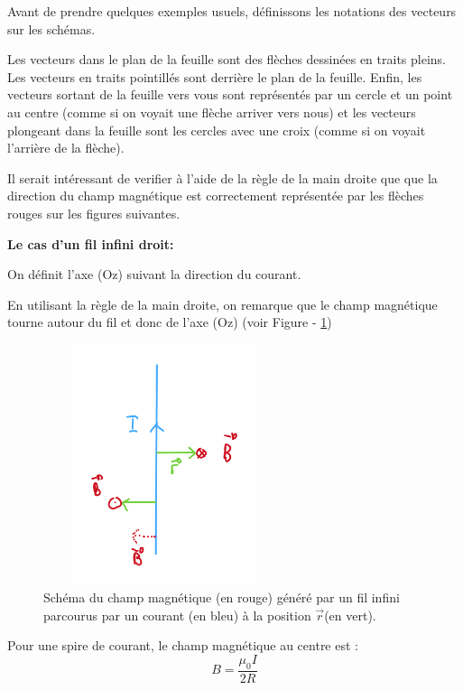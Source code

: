 \documentclass[14pt]{article}
\begin{document}
Avant de prendre quelques exemples usuels, définissons les notations des vecteurs sur les schémas.

Les vecteurs dans le plan de la feuille sont des flèches dessinées en traits pleins. Les vecteurs en traits pointillés sont derrière le plan de la feuille. Enfin, les vecteurs sortant de la feuille vers vous sont représentés par un cercle et un point au centre (comme si on voyait une flèche arriver vers nous) et les vecteurs plongeant dans la feuille sont les cercles avec une croix (comme si on voyait l'arrière de la flèche).

Il serait intéressant de verifier à l'aide de la règle de la main droite que que la direction du champ magnétique est correctement représentée par les flèches rouges sur les figures suivantes.

\textbf{Le cas d'un fil infini droit:}


On définit l'axe (Oz) suivant la direction du courant.

En utilisant la règle de la main droite, on remarque que le champ magnétique tourne autour du fil et donc de l'axe (Oz) (voir Figure - \ref{fig:fil})
 
\hspace{0.5pt}

\begin{figure}
    \centering
    \includegraphics[width=200pt, height=200pt]{fil.png}
    \caption{Schéma du champ magnétique (en rouge) généré par un fil infini parcourus par un courant (en bleu) à la position $\vec{r}$(en vert).}
    \label{fig:fil}
\end{figure}


Pour une spire de courant, le champ magnétique au centre est :
\begin{equation} \label{eq:1.2.4}
    B = \frac{\mu_0 I}{2R}
    \tag{1.2.4}
\end{equation}
\end{document}
